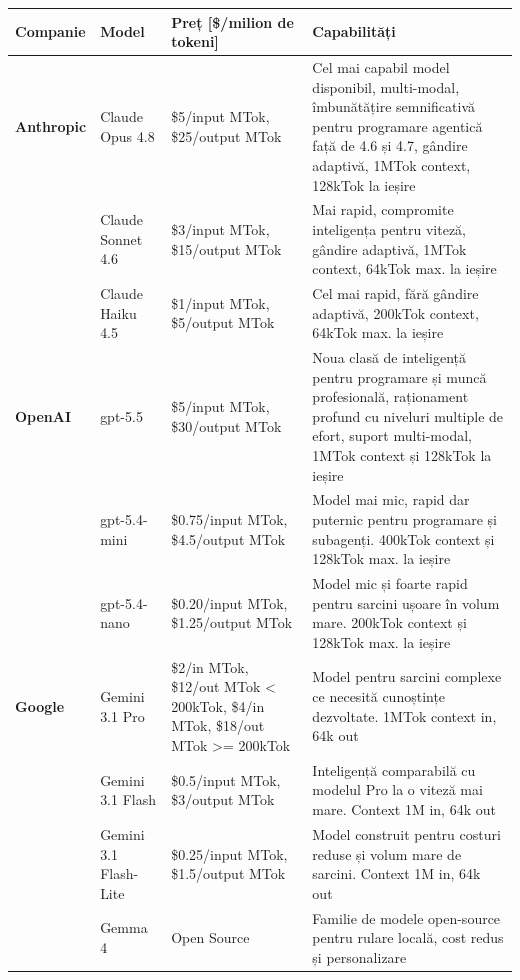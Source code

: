 \documentclass[12pt, a4paper, oneside, romanian]{teza-upb}
\begin{document}
  \begin{table}[H]
    \centering 
    \scriptsize
    \begin{tabularx}{\textwidth}{|>{\hsize=0.45\hsize\RaggedRight}X|>{\hsize=0.50\hsize\RaggedRight}X|>{\hsize=1.25\hsize\RaggedRight}X|>{\hsize=1.8\hsize\RaggedRight}X|}
      \hline
        \textbf{Companie} & \textbf{Model} & \textbf{Preț [\$/milion de tokeni]} & \textbf{Capabilități} \\
        \hline

        \textbf{Anthropic \cite{api_anthropic_models}} & Claude Opus 4.8 & \$5/input MTok, \$25/output MTok & Cel mai capabil model disponibil, multi-modal, îmbunătățire semnificativă pentru programare agentică față de 4.6 și 4.7, gândire adaptivă, 1MTok context, 128kTok la ieșire \\
        \hline
        & Claude Sonnet 4.6 & \$3/input MTok, \$15/output MTok & Mai rapid, compromite inteligența pentru viteză, gândire adaptivă, 1MTok context, 64kTok max. la ieșire \\
        \hline
        & Claude Haiku 4.5 & \$1/input MTok, \$5/output MTok & Cel mai rapid, fără gândire adaptivă, 200kTok context, 64kTok max. la ieșire \\
        \hline

        \textbf{OpenAI \cite{api_openai_models}} & gpt-5.5 & \$5/input MTok, \$30/output MTok & Noua clasă de inteligență pentru programare și muncă profesională, raționament profund cu niveluri multiple de efort, suport multi-modal, 1MTok context și 128kTok la ieșire \\
        \hline
        & gpt-5.4-mini & \$0.75/input MTok, \$4.5/output MTok & Model mai mic, rapid dar puternic pentru programare și subagenți. 400kTok context și 128kTok max. la ieșire \\
        \hline
        & gpt-5.4-nano & \$0.20/input MTok, \$1.25/output MTok & Model mic și foarte rapid pentru sarcini ușoare în volum mare. 200kTok context și 128kTok max. la ieșire \\
        \hline

        \textbf{Google \cite{api_gemini_models}} & Gemini 3.1 Pro & \$2/in MTok, \$12/out MTok < 200kTok, \$4/in MTok, \$18/out MTok >= 200kTok & Model pentru sarcini complexe ce necesită cunoștințe dezvoltate. 1MTok context in, 64k out \\
        \hline
        & Gemini 3.1 Flash & \$0.5/input MTok, \$3/output MTok & Inteligență comparabilă cu modelul Pro la o viteză mai mare. Context 1M in, 64k out \\
        \hline
        & Gemini 3.1 Flash-Lite & \$0.25/input MTok, \$1.5/output MTok & Model construit pentru costuri reduse și volum mare de sarcini. Context 1M in, 64k out \\
        \hline
        & Gemma 4 & Open Source & Familie de modele open-source pentru rulare locală, cost redus și personalizare \\
        \hline


\end{tabularx}
\end{table}
\end{document}
